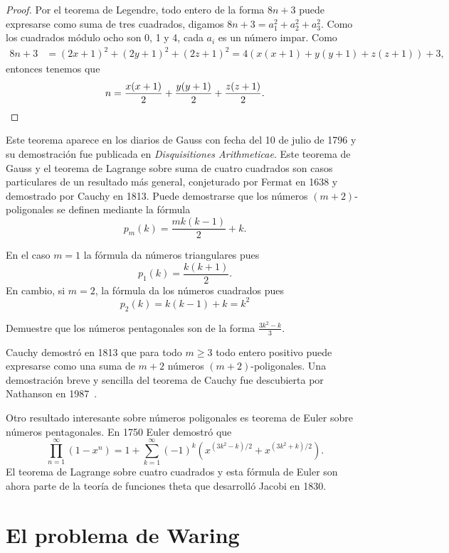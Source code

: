 \begin{proof}
	Por el teorema de Legendre, todo entero de la forma $8n+3$ puede expresarse
	como suma de tres cuadrados, digamos $8n+3=a_1^2+a_2^2+a_3^2$. Como los
	cuadrados módulo ocho son 0, 1 y 4, cada $a_i$ es un número impar. Como 
	\begin{align*}
		8n+3&=(2x+1)^2+(2y+1)^2+(2z+1)^2
		=4(x(x+1)+y(y+1)+z(z+1))+3,
	\end{align*}
	entonces tenemos que 
	\[
		n=\frac{x(x+1)}{2}+\frac{y(y+1)}{2}+\frac{z(z+1)}{2}.\qedhere
	\]
\end{proof}

Este teorema aparece en los diarios de Gauss con fecha del 10 de julio de 1796
y su demostración fue publicada en \emph{Disquisitiones Arithmeticae}.  Este
teorema de Gauss y el teorema de Lagrange sobre suma de cuatro cuadrados son
casos particulares de un resultado más general, conjeturado por Fermat en 1638
y demostrado por Cauchy en 1813.  Puede demostrarse que los números
$(m+2)$-poligonales se definen mediante la fórmula
\[
	p_m(k)=\frac{mk(k-1)}{2}+k.
\]

En el caso $m=1$ la fórmula da números triangulares pues
\[
	p_1(k)=\frac{k(k+1)}{2}.
\]
En cambio, si 
$m=2$, la fórmula da los números cuadrados pues
\[
p_2(k)=k(k-1)+k=k^2
\]

\begin{exercise}
	Demuestre que los números pentagonales son de la forma
	$\displaystyle{\frac{3k^2-k}{3}}$. 
\end{exercise}

Cauchy demostró en 1813 que para todo $m\geq3$ todo entero positivo puede
expresarse como una suma de $m+2$ números $(m+2)$-poligonales. Una demostración
breve y sencilla del teorema de Cauchy fue descubierta por Nathanson en
1987~\cite{MR866422}.

Otro resultado interesante sobre números poligonales es teorema de Euler sobre
números pentagonales. En 1750 Euler demostró que
\[
	\prod_{n=1}^\infty(1-x^n)=1+\sum_{k=1}^\infty (-1)^k\left(x^{(3k^2-k)/2}+x^{(3k^2+k)/2}\right).
\]
El teorema de Lagrange sobre cuatro cuadrados y esta fórmula de Euler son ahora
parte de la teoría de funciones theta que desarrolló Jacobi en 1830. 

%

\section*{El problema de Waring}

